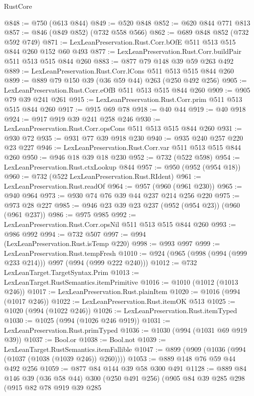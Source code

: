 \begin{lexlean}{RustCore}
\begin{coremodule}
@848 := @750 (@613 @844)
@849 := @520 @848
@852 := @620 @844 @771 @813
@857 := @846 (@849 @852) (@732 @558 @566)
@862 := @689 @848 @852 (@732 @592 @749)
@871 := LexLeanPreservation.Rust.Corr.bOfE @511 @513 @515 @844 @260 @152 @60 @493
@877 := LexLeanPreservation.Rust.Corr.buildPair @511 @513 @515 @844 @260
@883 := @877 @79 @148 @39 @59 @263 @492
@889 := LexLeanPreservation.Rust.Corr.lCons @511 @513 @515 @844 @260
@899 := @889 @79 @150 @39 (@36 @59 @44) @263 (@250 @492 @256)
@905 := LexLeanPreservation.Rust.Corr.eOfB @511 @513 @515 @844 @260
@909 := @905 @79 @39 @241 @261
@915 := LexLeanPreservation.Rust.Corr.prim @511 @513 @515 @844 @260
@917 := @915 @69 @78
@918 := @40 @44
@919 := @40 @918
@924 := @917 @919 @39 @241 @258 @246
@930 := LexLeanPreservation.Rust.Corr.opsCons @511 @513 @515 @844 @260
@931 := @930 @72
@935 := @931 @77 @39 @918 @230
@940 := @935 @240 @257 @220 @23 @227
@946 := LexLeanPreservation.Rust.Corr.var @511 @513 @515 @844 @260
@950 := @946 @18 @39 @18 @230
@952 := @732 (@522 @598)
@954 := LexLeanPreservation.Rust.ctxLookup @844
@957 := @950 (@952 (@954 @18))
@960 := @732 (@522 LexLeanPreservation.Rust.RIdent)
@961 := LexLeanPreservation.Rust.readOf
@964 := @957 (@960 (@961 @230))
@965 := @940 @964
@973 := @930 @74 @76 @39 @44 @237 @214 @256 @220
@975 := @973 @28 @227
@985 := @946 @23 @39 @23 @237 (@952 (@954 @23)) (@960 (@961 @237))
@986 := @975 @985
@992 := LexLeanPreservation.Rust.Corr.opsNil @511 @513 @515 @844 @260
@993 := @986 @992
@994 := @732 @507
@997 := @994 (LexLeanPreservation.Rust.isTemp @220)
@998 := @993 @997
@999 := LexLeanPreservation.Rust.tempFresh
@1010 := @924 (@965 (@998 (@994 (@999 @233 @214))) @997 (@994 (@999 @222 @240)))
@1012 := @732 LexLeanTarget.TargetSyntax.Prim
@1013 := LexLeanTarget.RustSemantics.itemPrimitive
@1016 := @1010 (@1012 (@1013 @246))
@1017 := LexLeanPreservation.Rust.plainItem
@1020 := @1016 (@994 (@1017 @246))
@1022 := LexLeanPreservation.Rust.itemOK @513
@1025 := @1020 (@994 (@1022 @246))
@1026 := LexLeanPreservation.Rust.itemTyped
@1030 := @1025 (@994 (@1026 @246 @919))
@1031 := LexLeanPreservation.Rust.primTyped
@1036 := @1030 (@994 (@1031 @69 @919 @39))
@1037 := Bool.or
@1038 := Bool.not
@1039 := LexLeanTarget.RustSemantics.itemFallible
@1047 := @899 (@909 (@1036 (@994 (@1037 (@1038 (@1039 @246)) @260))))
@1053 := @889 @148 @76 @59 @44 @492 @256
@1059 := @877 @84 @144 @39 @58 @300 @491
@1128 := @889
    @84
    @146
    @39
    (@36 @58 @44)
    @300
    (@250 @491 @256)
    (@905
      @84
      @39
      @285
      @298
      (@915
        @82
        @78
        @919
        @39
        @285

\end{coremodule}
\end{lexlean}
